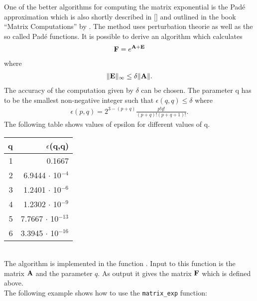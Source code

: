 \label{sec:pade_approximation}

One of the better algorithms for computing the matrix exponential is
the Pad\'e approximation which is also shortly described in
[\cite{Moler_Loan:79}] and outlined in the book ``Matrix
Computations'' by \cite{Golub_Loan:91}. 
The method uses perturbation theorie as well as the so called Pad\'e
functions. It is possible to derive an algorithm which calculates
\begin{eqnarray}
  {\bf F} = e^{{\bf A}+{\bf E}} 
\end{eqnarray}
where 
\begin{eqnarray}
  \|{\bf E}\|_\infty \le \delta \|{\bf A}\| .
\end{eqnarray}
The accuracy of the computation given by $\delta$ can be chosen. 
The parameter q has to be the smallest non-negative integer such that
$\epsilon(q,q)\le\delta$ where
\begin{eqnarray}
  \epsilon(p,q) = 2^{3-(p+q)}\frac{p!q!}{(p+q)!(p+q+1)!}.
\end{eqnarray}
The following table shows values of epsilon for
different values of q.
\vspace{0.5cm}\\
\begin{tabular}[h]{|r|r|}
 \hline
q & $\epsilon$(q,q) \\ \hline
1 & 0.1667\\
2 & 6.9444 $\cdot$ 10$^{-4}$ \\
3 & 1.2401 $\cdot$ 10$^{-6}$ \\
4 & 1.2302 $\cdot$ 10$^{-9}$ \\
5 & 7.7667 $\cdot$ 10$^{-13}$ \\
6 & 3.3945 $\cdot$ 10$^{-16}$ \\ 
\hline
\end{tabular}
\vspace{0.5cm}\\
The algorithm is implemented in the function . Input
to this function is the matrix ${\bf A}$ and the parameter $q$. As output
it gives the matrix ${\bf F}$ which is defined above.\\
The following example shows how to use the \verb|matrix_exp| function:
